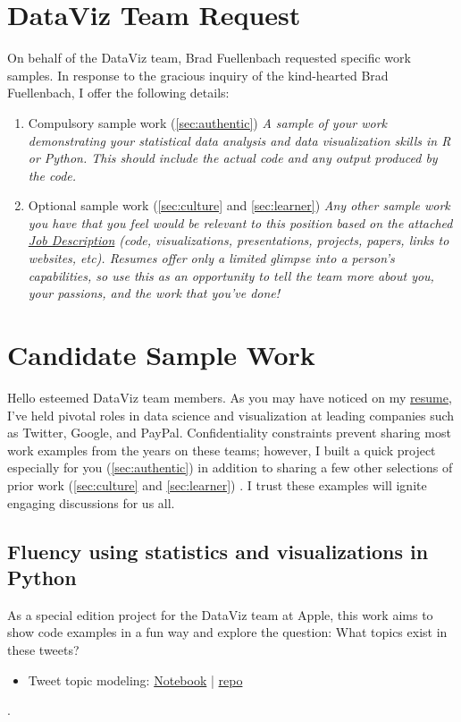 \documentclass[11pt]{article}
\begin{document}
\newpage
\section{DataViz Team Request}
On behalf of the DataViz team, Brad Fuellenbach requested specific work samples. In response to the gracious inquiry of the kind-hearted Brad Fuellenbach, I offer the following details:
\begin{enumerate}
        \item Compulsory sample work (\autoref{sec:authentic}) \textit{\quote A sample of your work demonstrating your statistical data analysis and data visualization skills in R or Python. This should include the actual code and any output produced by the code.\endquote}       
         \item Optional sample work (\autoref{sec:culture} and \autoref{sec:learner}) \textit{\quote Any other sample work you have that you feel would be relevant to this position based on the attached \href{https://jobs.apple.com/en-us/details/200495248}{Job Description} (code, visualizations, presentations, projects, papers, links to websites, etc). Resumes offer only a limited glimpse into a person's capabilities, so use this as an opportunity to tell the team more about you, your passions, and the work that you've done!\endquote}
\end{enumerate}


\section{Candidate Sample Work}
Hello esteemed DataViz team members. As you may have noticed on my \href{https://github.com/blehman/resume/blob/main/Resume-blehman-visual-storyteller.pdf}{resume}, I've held pivotal roles in data science and visualization at leading companies such as Twitter, Google, and PayPal. Confidentiality constraints prevent sharing most work examples from the years on these teams; however, I built a quick project especially for you (\autoref{sec:authentic}) in addition to sharing a few other selections of prior work (\autoref{sec:culture} and \autoref{sec:learner}) . I trust these examples will ignite engaging discussions for us all. 


\subsection{Fluency using statistics and visualizations in Python}\label{sec:authentic}
As a special edition project for the DataViz team at Apple, this work aims to show code examples in a fun way and explore the question: What topics exist in these tweets?
\begin{itemize}
	\item Tweet topic modeling: \href{https://github.com/blehman/code\_samples/blob/master/tweet\_topic\_modeling/tom_robbins\_whimsy.ipynb}{Notebook} | \href{https://github.com/blehman/code\_samples/tree/master/tweet\_topic\_modeling}{repo}
\end{itemize}. 
\end{document}
